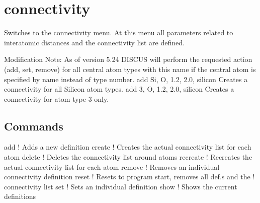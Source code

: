 \section{connectivity}
\par
Switches to the connectivity menu. 
At this menu all parameters related to interatomic distances 
and the connectivity list are defined. 
\par
Modification Note: As of version 5.24 DISCUS will perform the 
   requested action (add, set, remove) for all central atom 
   types with this name if the central atom is specified by 
   name instead of type number. 
   add Si, O, 1.2, 2.0, silicon 
   Creates a connectivity for all Silicon atom types. 
   add  3, O, 1.2, 2.0, silicon 
   Creates a connectivity for atom type 3 only. 
\par
\subsection*{Commands}
\begin{MacVerbatim}
add     ! Adds a new definition
create  ! Creates the actual connectivity list for each atom
delete  ! Deletes the connectivity list around atoms
recreate  ! Recreates the actual connectivity list for each atom
remove  ! Removes an individual connectivity definition
reset   ! Resets to program start, removes all def.s and the
        !        connectivity list
set     ! Sets an individual definition
show    ! Shows the current definitions
\end{MacVerbatim}
